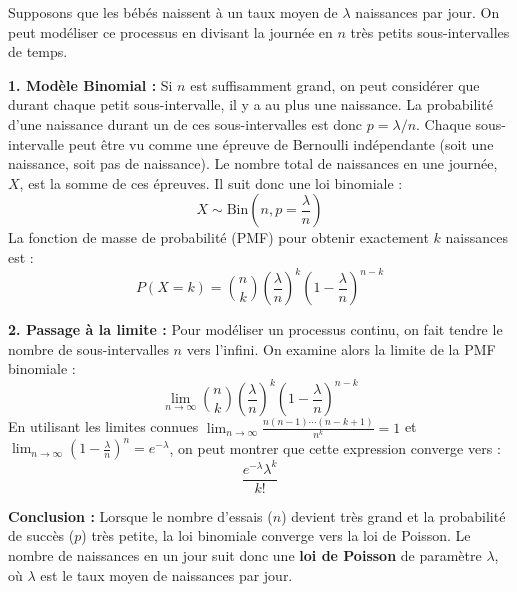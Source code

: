 \begin{proofbox}
Supposons que les bébés naissent à un taux moyen de \textbf{$\lambda$} naissances par jour. On peut modéliser ce processus en divisant la journée en \textbf{$n$} très petits sous-intervalles de temps.

\vspace{0.3cm}
\noindent\textbf{1. Modèle Binomial :}
\newline
Si $n$ est suffisamment grand, on peut considérer que durant chaque petit sous-intervalle, il y a au plus une naissance. La probabilité d'une naissance durant un de ces sous-intervalles est donc $p = \lambda/n$.
\newline
Chaque sous-intervalle peut être vu comme une épreuve de Bernoulli indépendante (soit une naissance, soit pas de naissance). Le nombre total de naissances en une journée, $X$, est la somme de ces épreuves. Il suit donc une loi binomiale :
$$ X \sim \text{Bin}\left(n, p = \frac{\lambda}{n}\right) $$
La fonction de masse de probabilité (PMF) pour obtenir exactement $k$ naissances est :
$$ P(X=k) = \binom{n}{k} \left(\frac{\lambda}{n}\right)^k \left(1-\frac{\lambda}{n}\right)^{n-k} $$

\vspace{0.3cm}
\noindent\textbf{2. Passage à la limite :}
\newline
Pour modéliser un processus continu, on fait tendre le nombre de sous-intervalles $n$ vers l'infini. On examine alors la limite de la PMF binomiale :
$$ \lim_{n\to\infty} \binom{n}{k} \left(\frac{\lambda}{n}\right)^k \left(1-\frac{\lambda}{n}\right)^{n-k} $$
En utilisant les limites connues $\lim_{n\to\infty} \frac{n(n-1)\cdots(n-k+1)}{n^k} = 1$ et $\lim_{n\to\infty} \left(1-\frac{\lambda}{n}\right)^n = e^{-\lambda}$, on peut montrer que cette expression converge vers :
$$ \frac{e^{-\lambda}\lambda^k}{k!} $$

\vspace{0.3cm}
\noindent\textbf{Conclusion :}
\newline
Lorsque le nombre d'essais ($n$) devient très grand et la probabilité de succès ($p$) très petite, la loi binomiale converge vers la loi de Poisson. Le nombre de naissances en un jour suit donc une \textbf{loi de Poisson} de paramètre $\lambda$, où $\lambda$ est le taux moyen de naissances par jour.
\end{proofbox}


